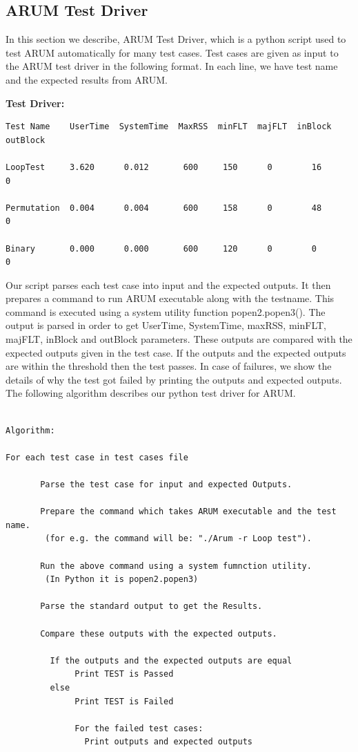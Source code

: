 \documentclass[11pt,letterpaper,oneside]{article}
\begin{document}
\subsection{ARUM Test Driver}

In this section we describe, ARUM Test Driver, which is a python script used to test ARUM automatically for many test cases. Test cases are given as input to the ARUM test driver in the following format. In each line, we have test name and the expected results from ARUM.\newline

{\bf Test Driver:}

\begin{verbatim}
Test Name    UserTime  SystemTime  MaxRSS  minFLT  majFLT  inBlock  outBlock

LoopTest     3.620      0.012       600     150      0        16       0

Permutation  0.004      0.004       600     158      0        48       0

Binary       0.000      0.000       600     120      0        0        0

\end{verbatim}

Our script parses each test case into input and the expected outputs. It then prepares a command to run ARUM executable along with the testname. This command is executed using a system utility function popen2.popen3(). The output is parsed in order to get UserTime, SystemTime, maxRSS, minFLT, majFLT, inBlock and outBlock parameters. These outputs are compared with the expected outputs given in the test case. If the outputs and the expected outputs are within the threshold then the test passes. In case of failures, we show the details of why the test got failed by printing the outputs and expected outputs. The following algorithm describes our python test driver for ARUM.\newline

\begin{verbatim}

Algorithm:

For each test case in test cases file

       Parse the test case for input and expected Outputs.
     
       Prepare the command which takes ARUM executable and the test name.
        (for e.g. the command will be: "./Arum -r Loop test").
       
       Run the above command using a system fumnction utility.
        (In Python it is popen2.popen3)

       Parse the standard output to get the Results.

       Compare these outputs with the expected outputs.
       
         If the outputs and the expected outputs are equal
              Print TEST is Passed
         else 
              Print TEST is Failed

              For the failed test cases:
                Print outputs and expected outputs
\end{verbatim}
\end{document}
